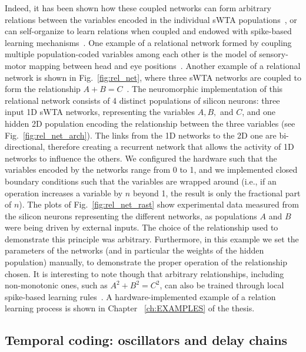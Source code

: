 Indeed, it has been shown how these coupled networks can form arbitrary relations between the variables encoded in the individual \ac{sWTA} populations~\cite{Cook_etal10}, or can self-organize to learn relations when coupled and endowed with spike-based learning mechanisms~\cite{Diehl_Cook16}.
One example of a relational network formed by coupling multiple population-coded variables among each other is the model of sensory-motor mapping between head and eye positions~\cite{Deneve_etal01}.
Another example of a relational network is shown in Fig.~\ref{fig:rel_net}, where three \ac{sWTA} networks are coupled to form the relationship $A+B=C$~\cite{Cook_etal10,Zhao_etal20}.
The neuromorphic implementation of this relational network consists of 4 distinct populations of silicon neurons: three input 1D \ac{sWTA} networks, representing the variables $A, B,$ and $C$, and one hidden 2D population encoding the relationship between the three variables (see Fig.~\ref{fig:rel_net_arch}). The links from the 1D networks to the 2D one are bi-directional, therefore creating a recurrent network that allows the activity of 1D networks to influence the others. We configured the hardware such that the variables encoded by the networks range from 0 to 1, and we implemented closed boundary conditions such that the variables are wrapped around (i.e., if an operation increases a variable by $n$ beyond 1, the result is only the fractional part of $n$). The plots of Fig.~\ref{fig:rel_net_rast} show experimental data measured from the silicon neurons representing the different networks, as populations $A$ and $B$ were being driven by external inputs.
The choice of the relationship used to demonstrate this principle was arbitrary.  Furthermore, in this example we set the parameters of the networks (and in particular the weights of the hidden population) manually, to demonstrate the proper operation of the relationship chosen. It is interesting to note though that arbitrary relationships, including non-monotonic ones, such as $A^2 + B^2 = C^2$, can also be trained through local spike-based learning rules~\cite{Jug12,Diehl_Cook16}. A hardware-implemented example of a relation learning process is shown in Chapter ~\ref{ch:EXAMPLES} of the thesis.


\subsection{Temporal coding: oscillators and delay chains}



